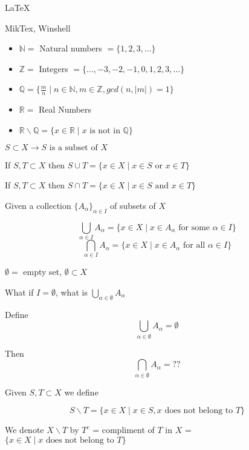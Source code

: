 
\LaTeX

MikTex, Winshell

\begin{defn}
\begin{itemize}
\item $\mathbb{N} = $ Natural numbers  $=\{1,2,3,\dots\}$
\item $\mathbb{Z} = $ Integers $ = \{\dots,-3,-2,-1,0,1,2,3,\dots \}$
\item $\mathbb{Q} = \{\frac{m}{n} \mid n\in \mathbb{N}, m\in \mathbb{Z},gcd(n,|m|)=1\}$
\item $\mathbb{R} = $ Real Numbers
\item $\mathbb{R}\backslash \mathbb{Q} = \{x\in \mathbb{R}  \mid  x\text{ is not in } \mathbb{Q}\}$
\end{itemize}
\end{defn}

\begin{nota}
\leavevmode

$S \subset X \to S \text{ is a subset of } X $

If $S, T \subset X$ then $S\cup T = \{x\in X\mid x\in S \text{ or } x\in T\}$

If $S, T \subset X$ then $S\cap T = \{x\in X\mid x\in S \text{ and } x\in T\}$

Given a collection $\{A_\alpha\}_{\alpha \in I}$ of subsets of $X$

$$\bigcup_{\alpha \in I} A_\alpha = \{x\in X \mid x\in A_\alpha \text{ for some } \alpha\in I\}$$
$$\bigcap_{\alpha \in I} A_\alpha = \{x\in X \mid x\in A_\alpha \text{ for all } \alpha\in I\}$$

$\emptyset=$ empty set, $\emptyset \subset X$

What if $I = \emptyset$, what is $\displaystyle \bigcup_{\alpha \in \emptyset}A_\alpha $

Define
$$\bigcup_{\alpha \in \emptyset} A_\alpha = \emptyset$$

Then 
$$\bigcap_{\alpha \in \emptyset} A_\alpha = ??$$

Given $S,T\subset X$ we define

$$S\backslash T = \{x\in X \mid x\in S , x \text{ does not belong to } T\}$$

We denote $X\backslash T$ by $T^c$ = compliment of $T$ in $X$ =   $ \{x\in X \mid x \text{ does not belong to } T\}$

\end{nota}

